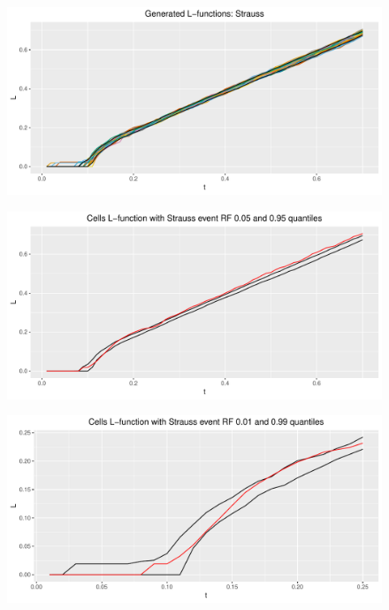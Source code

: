 \begin{figure}
    \centering
    \includegraphics[scale=0.65]{figures/gen_strauss_l.pdf}
    \caption{}
    \label{fig:gen_strauss_l}
\end{figure}

\begin{figure}
    \centering
    \includegraphics[scale=0.65]{figures/strauss_quant1.pdf}
    \caption{}
    \label{fig:strauss_quant1}
\end{figure}

\begin{figure}
    \centering
    \includegraphics[scale=0.65]{figures/strauss_quant2.pdf}
    \caption{}
    \label{fig:strauss  _quant2}
\end{figure}